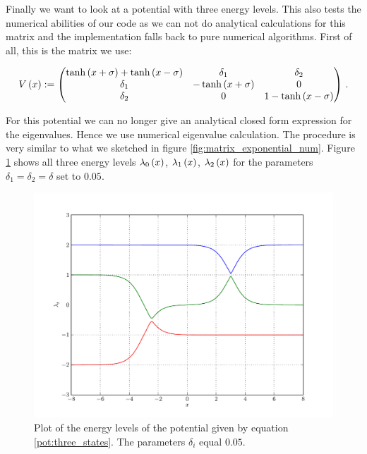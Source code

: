 Finally we want to look at a potential with three energy levels. This also tests
the numerical abilities of our code as we can not do analytical calculations for
this matrix and the implementation falls back to pure numerical algorithms. First
of all, this is the matrix we use:

\begin{equation} \label{pot:three_states}
  V\left( x \right) :=
  \begin{pmatrix}
    \tanh\left( x+\sigma \right) + \tanh\left( x-\sigma \right) & \delta_1             & \delta_2 \\
    \delta_1                                  & -\tanh\left( x+\sigma \right) & 0 \\
    \delta_2                                  & 0                    & 1-\tanh\left( x-\sigma \right)
  \end{pmatrix} \,.
\end{equation}

For this potential we can no longer give an analytical closed form expression
for the eigenvalues. Hence we use numerical eigenvalue calculation. The procedure
is very similar to what we sketched in figure \ref{fig:matrix_exponential_num}.
Figure \ref{fig:three_states} shows all three energy levels $\lambda_0\left( x \right)$, $\lambda_1\left( x \right)$, $\lambda_2\left( x \right)$
for the parameters $\delta_1 = \delta_2 = \delta$ set to $0.05$.

\begin{figure}
  \centering
  \includegraphics[width=0.8\linewidth]{./plot/three_states/potential_eigenvalues.pdf}
  \caption{Plot of the energy levels of the potential given by equation \eqref{pot:three_states}.
  The parameters $\delta_i$ equal $0.05$.}
  \label{fig:three_states}
\end{figure}

